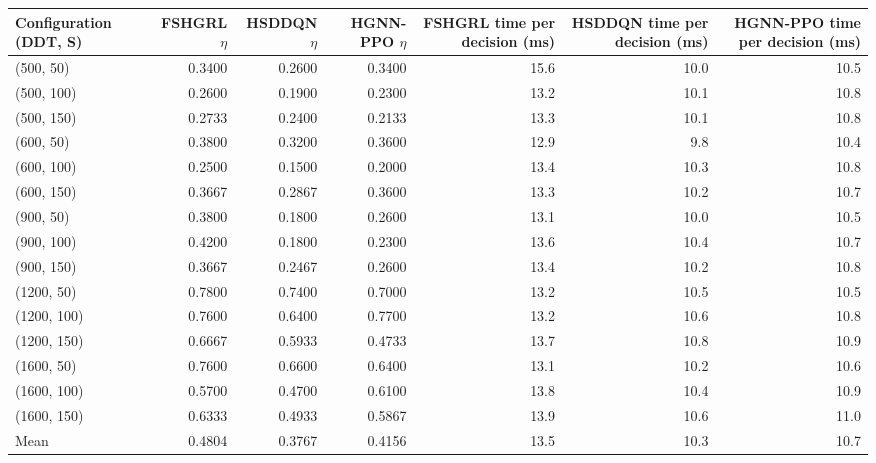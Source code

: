 \begin{tabular}{lrrrrrr}
\toprule
Configuration (DDT, S) & FSHGRL $\eta$ & HSDDQN $\eta$ & HGNN-PPO $\eta$ & FSHGRL time per decision (ms) & HSDDQN time per decision (ms) & HGNN-PPO time per decision (ms) \\
\midrule
(500, 50) & 0.3400 & 0.2600 & 0.3400 & 15.6 & 10.0 & 10.5 \\
(500, 100) & 0.2600 & 0.1900 & 0.2300 & 13.2 & 10.1 & 10.8 \\
(500, 150) & 0.2733 & 0.2400 & 0.2133 & 13.3 & 10.1 & 10.8 \\
(600, 50) & 0.3800 & 0.3200 & 0.3600 & 12.9 & 9.8 & 10.4 \\
(600, 100) & 0.2500 & 0.1500 & 0.2000 & 13.4 & 10.3 & 10.8 \\
(600, 150) & 0.3667 & 0.2867 & 0.3600 & 13.3 & 10.2 & 10.7 \\
(900, 50) & 0.3800 & 0.1800 & 0.2600 & 13.1 & 10.0 & 10.5 \\
(900, 100) & 0.4200 & 0.1800 & 0.2300 & 13.6 & 10.4 & 10.7 \\
(900, 150) & 0.3667 & 0.2467 & 0.2600 & 13.4 & 10.2 & 10.8 \\
(1200, 50) & 0.7800 & 0.7400 & 0.7000 & 13.2 & 10.5 & 10.5 \\
(1200, 100) & 0.7600 & 0.6400 & 0.7700 & 13.2 & 10.6 & 10.8 \\
(1200, 150) & 0.6667 & 0.5933 & 0.4733 & 13.7 & 10.8 & 10.9 \\
(1600, 50) & 0.7600 & 0.6600 & 0.6400 & 13.1 & 10.2 & 10.6 \\
(1600, 100) & 0.5700 & 0.4700 & 0.6100 & 13.8 & 10.4 & 10.9 \\
(1600, 150) & 0.6333 & 0.4933 & 0.5867 & 13.9 & 10.6 & 11.0 \\
Mean & 0.4804 & 0.3767 & 0.4156 & 13.5 & 10.3 & 10.7 \\
\bottomrule
\end{tabular}

